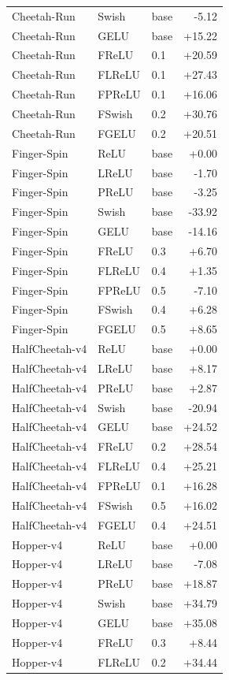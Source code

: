 {\begin{longtable}{lllr}
Cheetah-Run & Swish & base & -5.12 \\
Cheetah-Run & GELU & base & +15.22 \\
Cheetah-Run & FReLU & 0.1 & +20.59 \\
Cheetah-Run & FLReLU & 0.1 & +27.43 \\
Cheetah-Run & FPReLU & 0.1 & +16.06 \\
Cheetah-Run & FSwish & 0.2 & +30.76 \\
Cheetah-Run & FGELU & 0.2 & +20.51 \\
Finger-Spin & ReLU & base & +0.00 \\
Finger-Spin & LReLU & base & -1.70 \\
Finger-Spin & PReLU & base & -3.25 \\
Finger-Spin & Swish & base & -33.92 \\
Finger-Spin & GELU & base & -14.16 \\
Finger-Spin & FReLU & 0.3 & +6.70 \\
Finger-Spin & FLReLU & 0.4 & +1.35 \\
Finger-Spin & FPReLU & 0.5 & -7.10 \\
Finger-Spin & FSwish & 0.4 & +6.28 \\
Finger-Spin & FGELU & 0.5 & +8.65 \\
HalfCheetah-v4 & ReLU & base & +0.00 \\
HalfCheetah-v4 & LReLU & base & +8.17 \\
HalfCheetah-v4 & PReLU & base & +2.87 \\
HalfCheetah-v4 & Swish & base & -20.94 \\
HalfCheetah-v4 & GELU & base & +24.52 \\
HalfCheetah-v4 & FReLU & 0.2 & +28.54 \\
HalfCheetah-v4 & FLReLU & 0.4 & +25.21 \\
HalfCheetah-v4 & FPReLU & 0.1 & +16.28 \\
HalfCheetah-v4 & FSwish & 0.5 & +16.02 \\
HalfCheetah-v4 & FGELU & 0.4 & +24.51 \\
Hopper-v4 & ReLU & base & +0.00 \\
Hopper-v4 & LReLU & base & -7.08 \\
Hopper-v4 & PReLU & base & +18.87 \\
Hopper-v4 & Swish & base & +34.79 \\
Hopper-v4 & GELU & base & +35.08 \\
Hopper-v4 & FReLU & 0.3 & +8.44 \\
Hopper-v4 & FLReLU & 0.2 & +34.44 \\

\end{longtable}}
